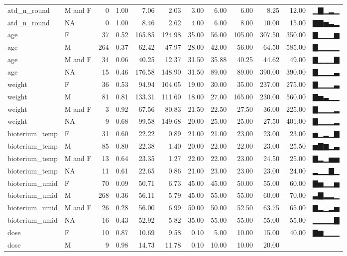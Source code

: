 \documentclass[
]{article}
\begin{document}
\begin{longtable}[]{@{}llrrrrrrrrrl@{}}
atd\_n\_round & M and F & 0 & 1.00 & 7.06 & 2.03 & 3.00 & 6.00 & 6.00 &
8.25 & 12.00 & ▁▇▁▂▁ \\
atd\_n\_round & NA & 0 & 1.00 & 8.46 & 2.62 & 4.00 & 6.00 & 8.00 & 10.00
& 15.00 & ▇▇▅▃▂ \\
age & F & 37 & 0.52 & 165.85 & 124.98 & 35.00 & 56.00 & 105.00 & 307.50
& 350.00 & ▇▁▁▁▆ \\
age & M & 264 & 0.37 & 62.42 & 47.97 & 28.00 & 42.00 & 56.00 & 64.50 &
585.00 & ▇▁▁▁▁ \\
age & M and F & 34 & 0.06 & 40.25 & 12.37 & 31.50 & 35.88 & 40.25 &
44.62 & 49.00 & ▇▁▁▁▇ \\
age & NA & 15 & 0.46 & 176.58 & 148.90 & 31.50 & 89.00 & 89.00 & 390.00
& 390.00 & ▇▁▁▁▃ \\
weight & F & 36 & 0.53 & 94.94 & 104.05 & 19.00 & 30.00 & 35.00 & 237.00
& 275.00 & ▇▁▁▁▃ \\
weight & M & 81 & 0.81 & 133.31 & 111.60 & 18.00 & 27.00 & 165.00 &
230.00 & 560.00 & ▇▅▃▁▁ \\
weight & M and F & 3 & 0.92 & 67.56 & 80.83 & 21.50 & 22.50 & 27.50 &
36.00 & 225.00 & ▇▁▁▁▂ \\
weight & NA & 9 & 0.68 & 99.58 & 149.68 & 20.00 & 25.00 & 25.00 & 27.50
& 401.00 & ▇▁▁▁▂ \\
bioterium\_temp & F & 31 & 0.60 & 22.22 & 0.89 & 21.00 & 21.00 & 23.00 &
23.00 & 23.00 & ▅▁▂▁▇ \\
bioterium\_temp & M & 85 & 0.80 & 22.38 & 1.40 & 20.00 & 22.00 & 22.00 &
23.00 & 25.50 & ▅▇▆▁▃ \\
bioterium\_temp & M and F & 13 & 0.64 & 23.35 & 1.27 & 22.00 & 22.00 &
23.00 & 24.50 & 25.00 & ▇▂▁▅▅ \\
bioterium\_temp & NA & 11 & 0.61 & 22.65 & 0.86 & 21.00 & 23.00 & 23.00
& 23.00 & 24.00 & ▂▁▁▇▁ \\
bioterium\_umid & F & 70 & 0.09 & 50.71 & 6.73 & 45.00 & 45.00 & 50.00 &
55.00 & 60.00 & ▇▅▁▁▅ \\
bioterium\_umid & M & 268 & 0.36 & 56.11 & 5.79 & 45.00 & 55.00 & 55.00
& 60.00 & 70.00 & ▃▇▂▂▁ \\
bioterium\_umid & M and F & 26 & 0.28 & 56.00 & 6.99 & 50.00 & 50.00 &
52.50 & 63.75 & 65.00 & ▇▂▁▂▅ \\
bioterium\_umid & NA & 16 & 0.43 & 52.92 & 5.82 & 35.00 & 55.00 & 55.00
& 55.00 & 55.00 & ▁▁▁▁▇ \\
dose & F & 10 & 0.87 & 10.69 & 9.58 & 0.10 & 5.00 & 10.00 & 15.00 &
40.00 & ▇▆▁▁▁ \\
dose & M & 9 & 0.98 & 14.73 & 11.78 & 0.10 & 10.00 & 10.00 & 20.00 &

\end{longtable}
\end{document}
